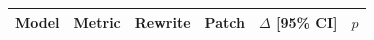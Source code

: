 \begin{tabular}{llrrrr}
\toprule
Model & Metric & Rewrite & Patch & $\Delta$ [95\% CI] & $p$ \\
\midrule
\bottomrule
\end{tabular}
